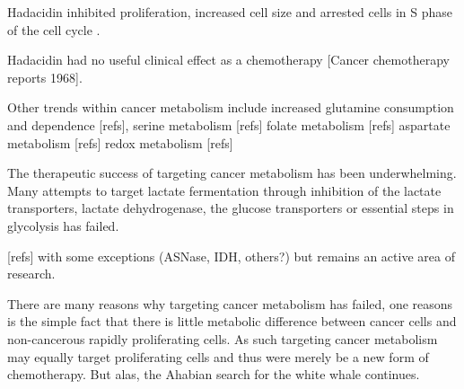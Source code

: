 Hadacidin inhibited proliferation, increased cell size and arrested cells in S phase of the cell cycle \cite{Ladino1989-rj}.

Hadacidin had no useful clinical effect as a chemotherapy [Cancer chemotherapy reports 1968].




Other trends within cancer metabolism include increased glutamine consumption and dependence [refs],
serine metabolism [refs]
folate metabolism [refs]
aspartate metabolism [refs]
redox metabolism [refs]

The therapeutic success of targeting cancer metabolism has been underwhelming.
Many attempts to target lactate fermentation through inhibition of the lactate transporters, lactate dehydrogenase, the glucose transporters or essential steps in glycolysis has failed.

[refs] with some exceptions (ASNase, IDH, others?) but remains an active area of research.

There are many reasons why targeting cancer metabolism has failed, one reasons is the simple fact that there is little metabolic difference between cancer cells and non-cancerous rapidly proliferating cells.
As such targeting cancer metabolism may equally target proliferating cells and thus were merely be a new form of chemotherapy.
But alas, the Ahabian search for the white whale continues.






